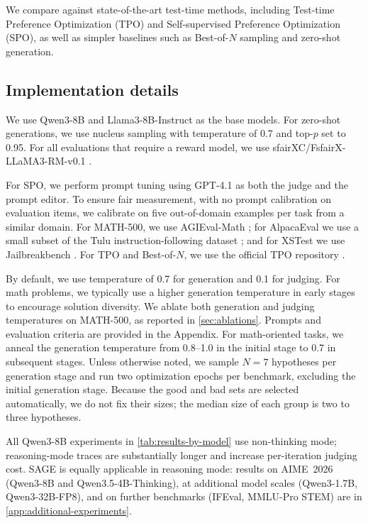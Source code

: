\documentclass[11pt]{article}
\theoremstyle{plain}
\theoremstyle{definition}
\theoremstyle{remark}
\newcommand{\method}{SAGE}
\begin{document}
We compare against state-of-the-art test-time methods, including Test-time Preference Optimization (TPO) and Self-supervised Preference Optimization (SPO), as well as simpler baselines such as Best-of-\(N\) sampling and zero-shot generation.

\subsection{Implementation details}
We use Qwen3-8B and Llama3-8B-Instruct as the base models. For zero-shot generations, we use nucleus sampling with temperature of 0.7 and top-\(p\) set to 0.95.
For all evaluations that require a reward model, we use sfairXC/FsfairX-LLaMA3-RM-v0.1 \citep{dong2024rlhf}.

For SPO, we perform prompt tuning using GPT-4.1 as both the judge and the prompt editor. To ensure fair measurement, with no prompt calibration on evaluation items, we calibrate on five out-of-domain examples per task from a similar domain.
For MATH-500, we use AGIEval-Math \citep{zhongagieval}; for AlpacaEval we use a small subset of the Tulu instruction-following dataset \citep{lambert2024tulu}; and for XSTest we use Jailbreakbench \citep{chao2024jailbreakbench}. For TPO and Best-of-\(N\), we use the official TPO repository \citep{litest}.

By default, we use temperature of 0.7 for generation and 0.1 for judging. For math problems, we typically use a higher generation temperature in early stages to encourage solution diversity. We ablate both generation and judging temperatures on MATH-500, as reported in \cref{sec:ablations}. Prompts and evaluation criteria are provided in the Appendix.
For math-oriented tasks, we anneal the generation temperature from 0.8--1.0 in the initial stage to 0.7 in subsequent stages. Unless otherwise noted, we sample \(N=7\) hypotheses per generation stage and run two optimization epochs per benchmark, excluding the initial generation stage. Because the good and bad sets are selected automatically, we do not fix their sizes; the median size of each group is two to three hypotheses.

All Qwen3-8B experiments in \cref{tab:results-by-model} use non-thinking mode; reasoning-mode traces are substantially longer and increase per-iteration judging cost. \method{} is equally applicable in reasoning mode: results on AIME~2026 (Qwen3-8B and Qwen3.5-4B-Thinking), at additional model scales (Qwen3-1.7B, Qwen3-32B-FP8), and on further benchmarks (IFEval, MMLU-Pro STEM) are in \cref{app:additional-experiments}.
\end{document}
